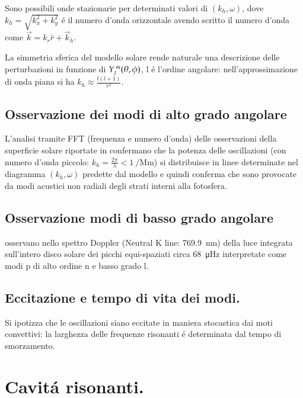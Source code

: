\documentclass[oneside,12pt]{memoir}
\begin{document}
Sono possibili onde stazionarie per determinati valori di  $(k_h,\omega)$, dove $k_h=\sqrt{k_x^2+k_y^2}$ \'e il numero d'onda orizzontale avendo scritto il numero d'onda come $\vec{k}=k_r\hat{r}+\vec{k}_h$.

La simmetria sferica del modello solare rende naturale una descrizione delle perturbazioni in funzione di $Y\indices{_l^m}(\theta,\phi)$, l \'e l'ordine angolare: nell'approssimazione di onda piana si ha $k_h\approx\frac{l(l+1)}{r^2}$.


\subsection{Osservazione dei modi di alto grado angolare}

L'analisi tramite FFT (frequenza e numero d'onda) delle osservazioni della superficie solare riportate in \citet{deu75observations} confermano che la  potenza delle oscillazioni (con numero d'onda piccolo: $k_h=\frac{2\pi}{\lambda}<\SI{1}{\per\mega\meter}$) si distribuisce in linee determinate nel diagramma $(k_h,\omega)$ predette dal modello e quindi conferma che sono provocate da modi acustici non radiali degli strati interni alla fotosfera.

\subsection{Osservazione modi di basso grado angolare}

\citet{cla79solar} osservano nello spettro Doppler (Neutral K line: \SI{769.9}{\nano\meter}) della luce integrata sull'intero disco solare dei picchi equi-spaziati circa \SI{68}{\micro\hertz} interpretate come modi p di alto ordine n e basso grado l.

\subsection{Eccitazione e tempo di vita dei modi.}

Si ipotizza che le oscillazioni siano eccitate in maniera stocastica dai moti convettivi: la larghezza delle frequenze risonanti \'e determinata dal tempo di smorzamento.

\section{Cavit\'a risonanti.} %
\end{document}
